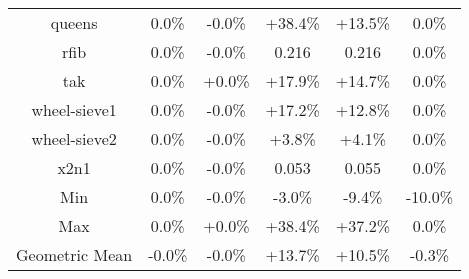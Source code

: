 \begin{tabular}{ c c c c c c }
queens &  0.0\% & -0.0\% & +38.4\% & +13.5\% &  0.0\%\\
rfib &  0.0\% & -0.0\% & 0.216 & 0.216 &  0.0\%\\
tak &  0.0\% & +0.0\% & +17.9\% & +14.7\% &  0.0\%\\
wheel-sieve1 &  0.0\% & -0.0\% & +17.2\% & +12.8\% &  0.0\%\\
wheel-sieve2 &  0.0\% & -0.0\% & +3.8\% & +4.1\% &  0.0\%\\
x2n1 &  0.0\% & -0.0\% & 0.053 & 0.055 &  0.0\%\\
\hline
Min &  0.0\% & -0.0\% & -3.0\% & -9.4\% & -10.0\%\\
Max &  0.0\% & +0.0\% & +38.4\% & +37.2\% &  0.0\%\\
Geometric Mean & -0.0\% & -0.0\% & +13.7\% & +10.5\% & -0.3\%\\


\end{tabular}
